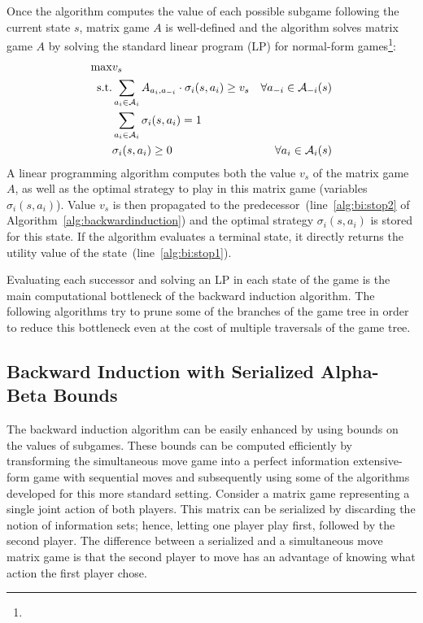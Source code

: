 Once the algorithm computes the value of each possible subgame following the current state $s$, matrix game $A$ is well-defined and the algorithm
solves matrix game $A$ by solving the standard linear program (LP) for normal-form games\footnote{}:
\begin{eqnarray}
\max & v_s & \\
\textrm{s.t.} & \sum_{a_i \in \mathcal{A}_{i}}A_{a_i,a_{-i}} \cdot \sigma_i(s,a_i) \geq v_s & \forall a_{-i} \in \mathcal{A}_{-i}(s)\\
& \sum_{a_{i} \in \mathcal{A}_{i}} \sigma_i(s,a_{i}) = 1 \\
& \sigma_i(s,a_{i}) \geq 0 & \forall a_{i} \in \mathcal{A}_{i}(s)
\end{eqnarray}
A linear programming algorithm computes both the value $v_s$ of the matrix game $A$, as well as the optimal strategy to play in this matrix game (variables $\sigma_i(s,a_i)$).
Value $v_s$ is then propagated to the predecessor~(line~\ref{alg:bi:stop2} of Algorithm~\ref{alg:backwardinduction}) and the optimal strategy $\sigma_i(s,a_i)$ is stored for this state.
If the algorithm evaluates a terminal state, it directly returns the utility value of the state~(line~\ref{alg:bi:stop1}).

Evaluating each successor and solving an LP in each state of the game is the main computational bottleneck of the backward induction algorithm.
The following algorithms try to prune some of the branches of the game tree in order to reduce this bottleneck even at the cost of multiple traversals of the game tree.

\subsection{Backward Induction with Serialized Alpha-Beta Bounds}\label{sec:algs:biab}

The backward induction algorithm can be easily enhanced by using bounds on the values of subgames.
These bounds can be computed efficiently by transforming the simultaneous move game into a perfect information extensive-form 
game with sequential moves and subsequently using some of the algorithms developed for this more standard setting.
Consider a matrix game representing a single joint action of both players.
This matrix can be serialized by discarding the notion of information sets; hence, letting one player play first, followed by the second player.
The difference between a serialized and a simultaneous move matrix game is that the second player to move has an advantage of knowing what action the first player chose.

